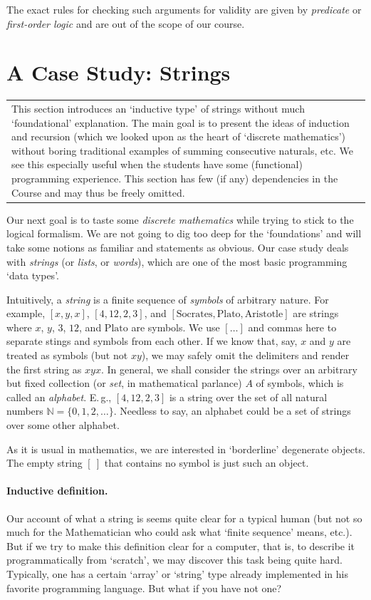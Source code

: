 \documentclass[12pt,notitlepage]{article}
\theoremstyle{plain}
\theoremstyle{definition}
\theoremstyle{plain}
\newcommand{\N}{\mathbb{N}}
\newcommand{\1}{\mathbf{1}}
\newcommand{\0}{\mathbf{0}}
\newcommand{\mcomm}[1]{
\medskip\noindent\begin{tabular}{| l}
\parbox{0.99\textwidth}{{\small
#1 }}\end{tabular}
\smallskip}
\begin{document}
The exact rules for checking such arguments for validity are given by \emph{predicate} or \emph{first-order logic} and are out of the scope of our course.

\section{A Case Study: Strings}\label{sect:strings}

\mcomm{This section introduces an `inductive type' of strings without much `foundational' explanation. The main goal is to present the ideas of induction and recursion (which we looked upon as the heart of `discrete mathematics') without boring traditional examples of summing consecutive naturals, etc. We see this especially useful when the students have some (functional) programming experience. This section has few (if any) dependencies in the Course and may thus be freely omitted.}

Our next goal is to taste some \emph{discrete mathematics} while trying to stick to the logical formalism. We are not going to dig too deep for the `foundations' and will take some notions as familiar and statements as obvious. Our case study deals with \emph{strings} (or \emph{lists}, or \emph{words}), which are one of the most basic programming `data types'.

Intuitively, a \emph{string} is a finite sequence of \emph{symbols} of arbitrary nature. For example, $[x, y, x]$, $[4, 12, 2, 3]$, and $[\mbox{Socrates}, \mbox{Plato}, \mbox{Aristotle}]$ are strings where $x$, $y$, $3$, $12$, and $\mbox{Plato}$ are symbols. We use $[\ldots]$ and commas here to separate stings and symbols from each other. If we know that, say, $x$ and $y$ are treated as symbols (but not $xy$), we may safely omit the delimiters and render the first string as $xyx$. In general, we shall consider the strings over an arbitrary but fixed collection (or \emph{set}, in mathematical parlance) $A$ of symbols, which is called an \emph{alphabet}. E.\,g., $[4, 12, 2, 3]$ is a string over the set of all natural numbers $\N = \{0,1,2,\ldots\}$. Needless to say, an alphabet could be a set of strings over some other alphabet.

As it is usual in mathematics, we are interested in `borderline' degenerate objects. The empty string $[\ ]$ that contains no symbol is just such an object.

\paragraph{Inductive definition.} Our account of what a string is seems quite clear for a typical human (but not so much for the Mathematician who could ask what `finite sequence' means, etc.). But if we try to make this definition clear for a computer, that is, to describe it programmatically from `scratch', we may discover this task being quite hard. Typically, one has a certain `array' or `string' type already implemented in his favorite programming language. But what if you have not one?
\end{document}

